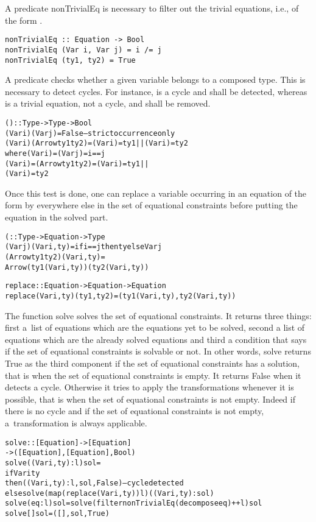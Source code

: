 \documentclass{jfp1}
\begin{document}
A predicate \textsf{nonTrivialEq} is necessary to filter out the trivial
equations, i.e., of the form .
\begin{verbatim}
nonTrivialEq :: Equation -> Bool
nonTrivialEq (Var i, Var j) = i /= j
nonTrivialEq (ty1, ty2) = True
\end{verbatim}
A predicate {\EUR} checks whether a given variable belongs to a composed type. This
is necessary to detect cycles. For instance,  is a cycle and shall
be detected, whereas  is a trivial equation, not a cycle, and shall be
removed.
\begin{alltt} 
(\EUR) :: Type -> Type -> Bool 
(Var i) \EUR (Var j) = False -- strict occurrence only
(Var i) \EUR (Arrow ty1 ty2) =  (Var i) \EUR= ty1 || (Var i) \EUR= ty2
    where (Var i) \EUR= (Var j) = i == j
          (Var i) \EUR= (Arrow ty1 ty2) = (Var i) \EUR= ty1 || 
                                       (Var i) \EUR= ty2
\end{alltt}
Once this test is done, one can replace a variable  occurring in an equation of
the form  by  everywhere else in the set of equational constraints
before putting the equation  in the solved part.
\pagebreak[4]
\begin{alltt}
( :: Type -> Equation -> Type
(Var j)  (Var i, ty) = if i == j then ty else Var j
(Arrow ty1 ty2)  (Var i, ty) = 
  Arrow (ty1  (Var i, ty)) (ty2  (Var i, ty))

replace::  Equation -> Equation -> Equation
replace (Var i,ty) (ty1,ty2) = (ty1  (Var i,ty),  ty2  (Var i,ty))
\end{alltt}
The function \textsf{solve} solves the set of equational constraints.  It returns three things:
first a~list of equations which are the equations yet to be solved, second a list of
equations which are the already solved equations and third a condition that says if the set
of equational constraints is solvable or not.  In other words, \textsf{solve} returns
\textsf{True} as the third component if the set of equational constraints has a solution, that
is when the set of equational constraints is empty.  It returns \textsf{False} when it detects a
cycle. Otherwise it tries to apply the transformations whenever it is possible, that
is when the set of equational constraints is not empty. Indeed if there is no cycle and if the
set of equational constraints is not empty, a~transformation is always applicable.
\begin{normalsize}
\begin{alltt}
solve :: [Equation] -> [Equation]
                    -> ([Equation],[Equation],Bool)
solve ((Var i,ty):l) sol = 
  if Var i \EUR ty 
  then ((Var i,ty):l,sol,False) -- cycle detected
  else solve (map (replace (Var i,ty)) l) ((Var i,ty):sol)
solve (eq:l) sol = solve (filter nonTrivialEq (decompose eq) ++ l) sol
solve [] sol = ([],sol,True)
\end{alltt}
\end{normalsize}
\end{document}
